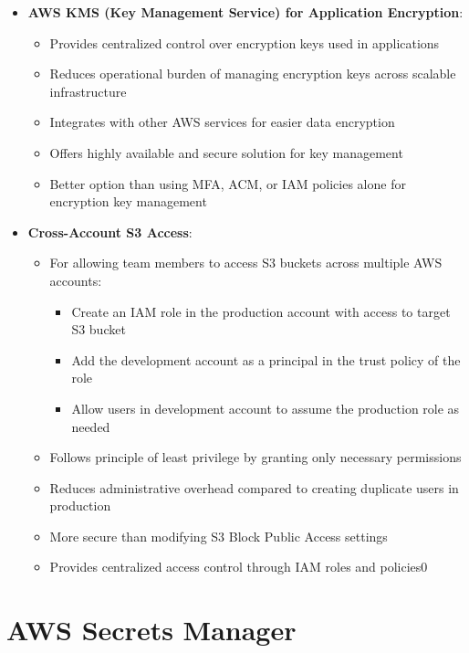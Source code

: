 \documentclass[11pt,a4paper]{report}
\begin{document}
\begin{itemize}
\begin{itemize}
\end{itemize}
  \item \textbf{AWS KMS (Key Management Service) for Application Encryption}:
\begin{itemize}
  \item Provides centralized control over encryption keys used in applications
  \item Reduces operational burden of managing encryption keys across scalable infrastructure
  \item Integrates with other AWS services for easier data encryption
  \item Offers highly available and secure solution for key management
  \item Better option than using MFA, ACM, or IAM policies alone for encryption key management
\end{itemize}
  \item \textbf{Cross-Account S3 Access}:
\begin{itemize}
  \item For allowing team members to access S3 buckets across multiple AWS accounts:
\begin{itemize}
  \item Create an IAM role in the production account with access to target S3 bucket
  \item Add the development account as a principal in the trust policy of the role
  \item Allow users in development account to assume the production role as needed
\end{itemize}
  \item Follows principle of least privilege by granting only necessary permissions
  \item Reduces administrative overhead compared to creating duplicate users in production
  \item More secure than modifying S3 Block Public Access settings
  \item Provides centralized access control through IAM roles and policies0
\end{itemize}
\end{itemize}

\section{AWS Secrets Manager}
\end{document}
